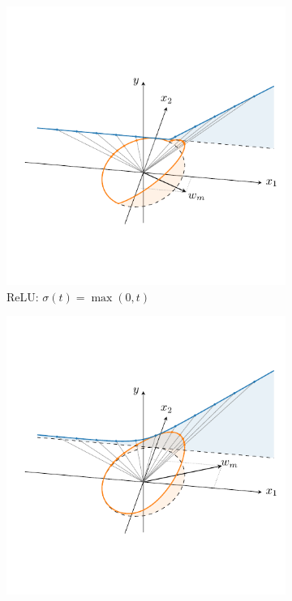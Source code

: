 \begin{figure}[t]
    \centering
     \begin{subfigure}[b]{0.49\textwidth}
         \centering
        \includegraphics[clip, trim=0cm 1.8cm 0cm 1.6cm, width=\textwidth]{relu_mapping}
        \caption{ReLU: $\sigma(t) = \max(0, t)$}
         \label{fig:projection:relu}
     \end{subfigure}
     \hfill
     \begin{subfigure}[b]{0.49\textwidth}
         \centering
        \includegraphics[clip, trim=0cm 1.8cm 0cm 1.6cm, width=\textwidth]{softplus_mapping}

\end{subfigure}
\end{figure}
